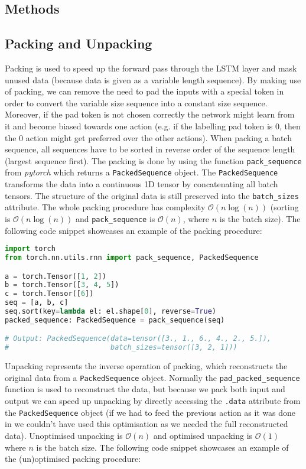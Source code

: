 \begin{appendices}
\chapter{Methods} \label{sec: app_methods}

\section{Packing and Unpacking}

Packing is used to speed up the forward pass through the LSTM layer and mask unused data (because data is given as a variable length sequence). By making use of packing, we can remove the need to pad the inputs with a special token in order to convert the variable size sequence into a constant size sequence. Moreover, if the pad token is not chosen correctly the network might learn from it and become biased towards one action (e.g. if the labelling pad token is 0, then the 0 action might get preferred over the other actions). When packing a batch sequence, all sequences have to be sorted in reverse order of the sequence length (largest sequence first). The packing is done by using the function \texttt{pack\_sequence} from \textit{pytorch} which returns a \texttt{PackedSequence} object. The \texttt{PackedSequence} transforms the data into a continuous 1D tensor by concatenating all batch tensors. The structure of the original data is still preserved into the \texttt{batch\_sizes} attribute. The whole packing procedure has complexity $\mathcal{O}(n\log(n))$ (sorting is $\mathcal{O}(n\log(n))$ and \texttt{pack\_sequence} is $\mathcal{O}(n)$, where $n$ is the batch size). The following code snippet showcases an example of the packing procedure:

\begin{lstlisting}[language=Python]
import torch
from torch.nn.utils.rnn import pack_sequence, PackedSequence

a = torch.Tensor([1, 2])
b = torch.Tensor([3, 4, 5])
c = torch.Tensor([6])
seq = [a, b, c]
seq.sort(key=lambda el: el.shape[0], reverse=True)
packed_sequence: PackedSequence = pack_sequence(seq)

# Output: PackedSequence(data=tensor([3., 1., 6., 4., 2., 5.]), 
#                        batch_sizes=tensor([3, 2, 1]))
\end{lstlisting}

Unpacking represents the inverse operation of packing, which reconstructs the original data from a \texttt{PackedSequence} object. Normally the \texttt{pad\_packed\_sequence} function is used to reconstruct the data, but because we pack both input and output we can speed up unpacking by directly accessing the \texttt{.data} attribute from the \texttt{PackedSequence} object (if we had to feed the previous action as it was done in \cite{nicola2018lstm} we couldn't have used this optimisation as we needed the full reconstructed data). Unoptimised unpacking is $\mathcal{O}(n)$ and optimised unpacking is $\mathcal{O}(1)$ where $n$ is the batch size. The following code snippet showcases an example of the (un)optimised packing procedure:


\end{appendices}
